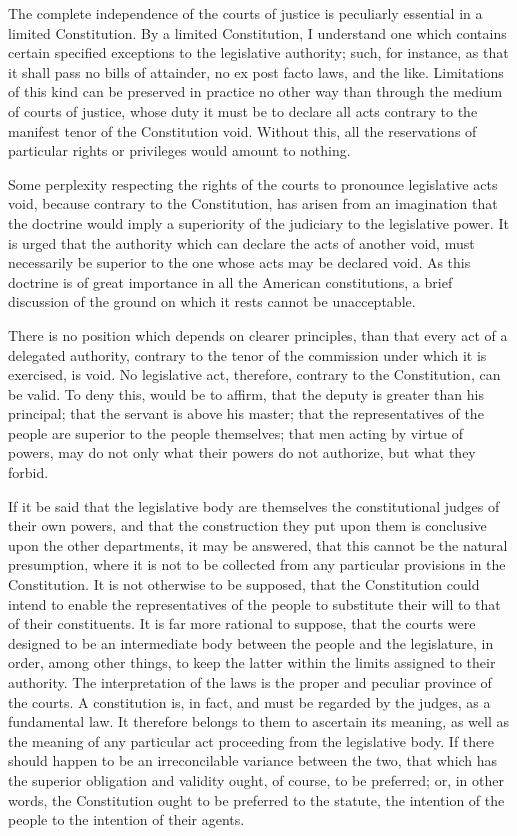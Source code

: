 The complete independence of the courts of justice is peculiarly essential in a limited Constitution. By a limited Constitution, I understand one which contains certain specified exceptions to the legislative authority; such, for instance, as that it shall pass no bills of attainder, no ex post facto laws, and the like. Limitations of this kind can be preserved in practice no other way than through the medium of courts of justice, whose duty it must be to declare all acts contrary to the manifest tenor of the Constitution void. Without this, all the reservations of particular rights or privileges would amount to nothing.

Some perplexity respecting the rights of the courts to pronounce legislative acts void, because contrary to the Constitution, has arisen from an imagination that the doctrine would imply a superiority of the judiciary to the legislative power. It is urged that the authority which can declare the acts of another void, must necessarily be superior to the one whose acts may be declared void. As this doctrine is of great importance in all the American constitutions, a brief discussion of the ground on which it rests cannot be unacceptable.

There is no position which depends on clearer principles, than that every act of a delegated authority, contrary to the tenor of the commission under which it is exercised, is void. No legislative act, therefore, contrary to the Constitution, can be valid. To deny this, would be to affirm, that the deputy is greater than his principal; that the servant is above his master; that the representatives of the people are superior to the people themselves; that men acting by virtue of powers, may do not only what their powers do not authorize, but what they forbid.

If it be said that the legislative body are themselves the constitutional judges of their own powers, and that the construction they put upon them is conclusive upon the other departments, it may be answered, that this cannot be the natural presumption, where it is not to be collected from any particular provisions in the Constitution. It is not otherwise to be supposed, that the Constitution could intend to enable the representatives of the people to substitute their will to that of their constituents. It is far more rational to suppose, that the courts were designed to be an intermediate body between the people and the legislature, in order, among other things, to keep the latter within the limits assigned to their authority. The interpretation of the laws is the proper and peculiar province of the courts. A constitution is, in fact, and must be regarded by the judges, as a fundamental law. It therefore belongs to them to ascertain its meaning, as well as the meaning of any particular act proceeding from the legislative body. If there should happen to be an irreconcilable variance between the two, that which has the superior obligation and validity ought, of course, to be preferred; or, in other words, the Constitution ought to be preferred to the statute, the intention of the people to the intention of their agents.

